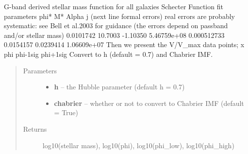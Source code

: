 \documentclass[letterpaper,10pt,english]{sphinxmanual}
\begin{document}

\begin{fulllineitems}
\label{SamPy.astronomy:SamPy.astronomy.stellarMFs.bellG}
G-band derived stellar mass function for all galaxies
Schecter Function fit parameters
phi* M* Alpha j  (next line formal errors)
real errors are probably systematic: see Bell et al.2003 for
guidance (the errors depend on passband and/or stellar mass)
0.0101742      10.7003     -1.10350  5.46759e+08
0.000512733    0.0154157    0.0239414  1.06609e+07
Then we present the V/V\_max data points; x   phi  phi-1sig  phi+1sig
Convert to h (default = 0.7) and Chabrier IMF.
\begin{quote}\begin{description}
\item[{Parameters}] \leavevmode\begin{itemize}
\item {} 
\textbf{h} -- the Hubble parameter (default h = 0.7)

\item {} 
\textbf{chabrier} -- whether or not to convert to Chabrier IMF (default = True)

\end{itemize}

\item[{Returns}] \leavevmode
log10(stellar mass), log10(phi), log10(phi\_low), log10(phi\_high)

\end{description}\end{quote}

\end{fulllineitems}


\end{document}

